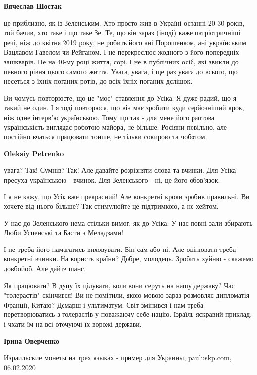 \begin{itemize}
\begin{itemize}
\textbf{Вячеслав Шостак} 

це приблизно, як із Зеленським. Хто просто жив в Україні останні 20-30 років,
той бачив, хто таке і що таке Зе. Те, що він зараз (іноді) каже патріотричніші
речі, ніж до квітня 2019 року, не робить його ані Порошенком, ані українським
Вацлавом Гавелом чи Рейганом. І не перекреслює жодного з його попередніх
зашкварів. Не на 40-му році життя, сорі. І не в публічних осіб, які звикли до
певного рівня цього самого життя. Увага, увага, і ще раз увага до всього, що
несеться з їхніх поганих ротів, до всіх їхніх поганих дєлішок.

Ви чомусь повторюєте, що це "моє" ставлення до Усіка. Я дуже радий, що я такий
не один. І я тоді повторюся, що він має зробити куди серйозніший крок, ніж одне
інтерв'ю українською. Тому що так - для мене його раптова українськість
виглядає роботою майора, не більше. Росіяни повільно, але постійно вчаться
працювати тонше, не тільки сокирою та чоботом.

\textbf{Oleksiy Petrenko} 

увага? Так! Сумнів? Так! Але давайте розрізняти слова та вчинки. Для Усіка
пресуха українською - вчинок. Для Зеленського - ні, це його обов’язок.

І я не кажу, що Усік вже прекрасний! Але конкретні кроки зробив правильні. Ви
хочете від нього більше? Так стимулюйте це підтримкою, а не хейтом.

У нас до Зеленського нема стільки вимог, як до Усіка. У нас повні зали збирають
Люби Успенські та Басти з Меладзами!

І не треба його намагатись виховувати. Він сам або ні. Але оцінювати треба
конкретні вчинки. На користь країни? Добре, молодець. Зробить хуйню - скажемо
довбойоб. Але дайте шанс.

\end{itemize} %


Як працювати? В дупу їх цілувати, коли вони серуть на нашу державу? Час
"толерастів" скінчився! Ви не помітили, якою мовою зараз розмовляє дипломатія
Франції, Китаю? Демарш і ультиматум. Світ змінився і нам треба перетворюватись
з толерастів у поважаючу себе націю. Ізраїль яскравий приклад, і чхати їм на
всі оточуючі їх ворожі держави.

\begin{itemize} %
\textbf{Ірина Оверченко} 

\href{http://pauluskp.com/news/93e64b6c4}{%
Израильские монеты на трех языках - пример для Украины, pauluskp.com, 06.02.2020%
}


\end{itemize}
\end{itemize}
